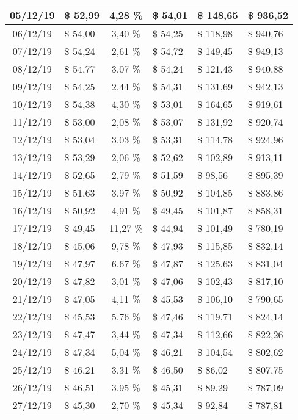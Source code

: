 \begin{center}
\begin{small}
\begin{longtable}{|c|l|c|l|l|l|}
05/12/19 & \$ 52,99 & 4,28 \% & \$ 54,01 & \$ 148,65 & \$ 936,52 \\ \hline
06/12/19 & \$ 54,00 & 3,40 \% & \$ 54,25 & \$ 118,98 & \$ 940,76 \\ \hline
07/12/19 & \$ 54,24 & 2,61 \% & \$ 54,72 & \$ 149,45 & \$ 949,13 \\ \hline
08/12/19 & \$ 54,77 & 3,07 \% & \$ 54,24 & \$ 121,43 & \$ 940,88 \\ \hline
09/12/19 & \$ 54,25 & 2,44 \% & \$ 54,31 & \$ 131,69 & \$ 942,13 \\ \hline
10/12/19 & \$ 54,38 & 4,30 \% & \$ 53,01 & \$ 164,65 & \$ 919,61 \\ \hline
11/12/19 & \$ 53,00 & 2,08 \% & \$ 53,07 & \$ 131,92 & \$ 920,74 \\ \hline
12/12/19 & \$ 53,04 & 3,03 \% & \$ 53,31 & \$ 114,78 & \$ 924,96 \\ \hline
13/12/19 & \$ 53,29 & 2,06 \% & \$ 52,62 & \$ 102,89 & \$ 913,11 \\ \hline
14/12/19 & \$ 52,65 & 2,79 \% & \$ 51,59 & \$ 98,56 & \$ 895,39 \\ \hline
15/12/19 & \$ 51,63 & 3,97 \% & \$ 50,92 & \$ 104,85 & \$ 883,86 \\ \hline
16/12/19 & \$ 50,92 & 4,91 \% & \$ 49,45 & \$ 101,87 & \$ 858,31 \\ \hline
17/12/19 & \$ 49,45 & 11,27 \% & \$ 44,94 & \$ 101,49 & \$ 780,19 \\ \hline
18/12/19 & \$ 45,06 & 9,78 \% & \$ 47,93 & \$ 115,85 & \$ 832,14 \\ \hline
19/12/19 & \$ 47,97 & 6,67 \% & \$ 47,87 & \$ 125,63 & \$ 831,04 \\ \hline
20/12/19 & \$ 47,82 & 3,01 \% & \$ 47,06 & \$ 102,43 & \$ 817,10 \\ \hline
21/12/19 & \$ 47,05 & 4,11 \% & \$ 45,53 & \$ 106,10 & \$ 790,65 \\ \hline
22/12/19 & \$ 45,53 & 5,76 \% & \$ 47,46 & \$ 119,71 & \$ 824,14 \\ \hline
23/12/19 & \$ 47,47 & 3,44 \% & \$ 47,34 & \$ 112,66 & \$ 822,26 \\ \hline
24/12/19 & \$ 47,34 & 5,04 \% & \$ 46,21 & \$ 104,54 & \$ 802,62 \\ \hline
25/12/19 & \$ 46,21 & 3,31 \% & \$ 46,50 & \$ 86,02 & \$ 807,75 \\ \hline
26/12/19 & \$ 46,51 & 3,95 \% & \$ 45,31 & \$ 89,29 & \$ 787,09 \\ \hline
27/12/19 & \$ 45,30 & 2,70 \% & \$ 45,34 & \$ 92,84 & \$ 787,81 \\ \hline

\end{longtable}
\end{small}
\end{center}
